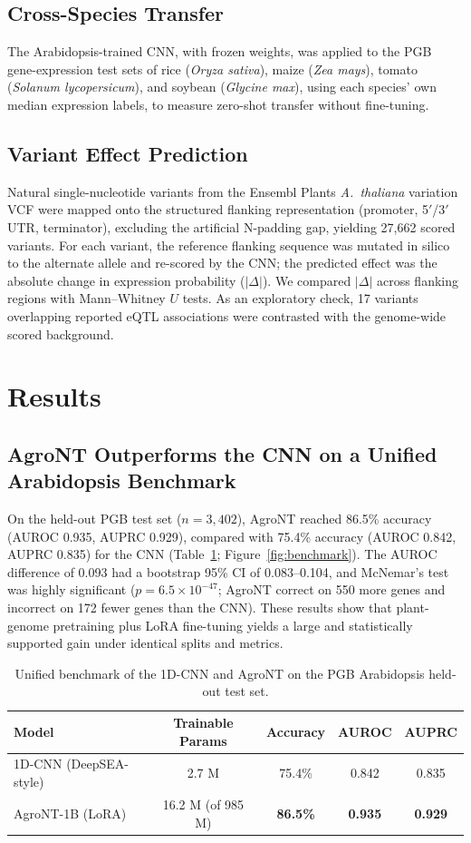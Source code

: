 \documentclass[genes,article,submit,moreauthors,pdftex]{Definitions/mdpi}
\begin{document}
\subsection{Cross-Species Transfer}
The Arabidopsis-trained CNN, with frozen weights, was applied to the PGB gene-expression test sets of rice (\emph{Oryza sativa}), maize (\emph{Zea mays}), tomato (\emph{Solanum lycopersicum}), and soybean (\emph{Glycine max}), using each species' own median expression labels, to measure zero-shot transfer without fine-tuning.

\subsection{Variant Effect Prediction}
Natural single-nucleotide variants from the Ensembl Plants \emph{A.\ thaliana} variation VCF were mapped onto the structured flanking representation (promoter, 5$'$/3$'$ UTR, terminator), excluding the artificial N-padding gap, yielding 27{,}662 scored variants. For each variant, the reference flanking sequence was mutated in silico to the alternate allele and re-scored by the CNN; the predicted effect was the absolute change in expression probability ($|\Delta|$). We compared $|\Delta|$ across flanking regions with Mann--Whitney $U$ tests. As an exploratory check, 17 variants overlapping reported eQTL associations were contrasted with the genome-wide scored background.

\section{Results}
\subsection{AgroNT Outperforms the CNN on a Unified Arabidopsis Benchmark}
On the held-out PGB test set ($n = 3{,}402$), AgroNT reached 86.5\% accuracy (AUROC 0.935, AUPRC 0.929), compared with 75.4\% accuracy (AUROC 0.842, AUPRC 0.835) for the CNN (Table~\ref{tab:benchmark}; Figure~\ref{fig:benchmark}). The AUROC difference of 0.093 had a bootstrap 95\% CI of 0.083--0.104, and McNemar's test was highly significant ($p = 6.5\times10^{-47}$; AgroNT correct on 550 more genes and incorrect on 172 fewer genes than the CNN). These results show that plant-genome pretraining plus LoRA fine-tuning yields a large and statistically supported gain under identical splits and metrics.

\begin{table}[H]
\caption{Unified benchmark of the 1D-CNN and AgroNT on the PGB Arabidopsis held-out test set.}
\label{tab:benchmark}
\centering
\begin{tabular}{lcccc}
\toprule
\textbf{Model} & \textbf{Trainable Params} & \textbf{Accuracy} & \textbf{AUROC} & \textbf{AUPRC} \\
\midrule
1D-CNN (DeepSEA-style) & 2.7 M & 75.4\% & 0.842 & 0.835 \\
AgroNT-1B (LoRA) & 16.2 M (of 985 M) & \textbf{86.5\%} & \textbf{0.935} & \textbf{0.929} \\
\bottomrule
\end{tabular}
\end{table}
\end{document}
